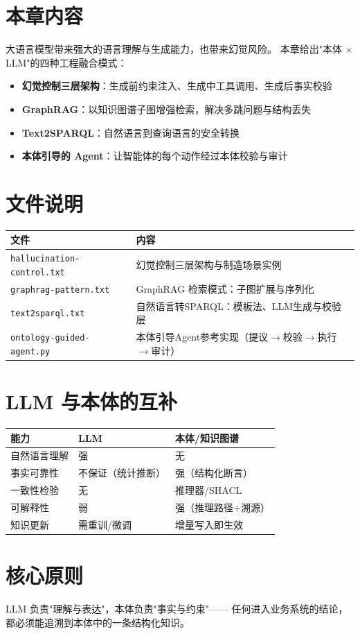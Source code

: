 
\section{本章内容}

大语言模型带来强大的语言理解与生成能力，也带来幻觉风险。
本章给出"本体 \(\times\) LLM"的四种工程融合模式：
\begin{itemize}
\item \textbf{幻觉控制三层架构}：生成前约束注入、生成中工具调用、生成后事实校验
\item \textbf{GraphRAG}：以知识图谱子图增强检索，解决多跳问题与结构丢失
\item \textbf{Text2SPARQL}：自然语言到查询语言的安全转换
\item \textbf{本体引导的 Agent}：让智能体的每个动作经过本体校验与审计
\end{itemize}

\section{文件说明}

\begin{center}
\begin{tabularx}{\linewidth}{@{}XX@{}}
\toprule
\textbf{文件} & \textbf{内容} \\
\midrule
\texttt{hallucination-control.txt} & 幻觉控制三层架构与制造场景实例 \\
\texttt{graphrag-pattern.txt} & GraphRAG 检索模式：子图扩展与序列化 \\
\texttt{text2sparql.txt} & 自然语言转SPARQL：模板法、LLM生成与校验层 \\
\texttt{ontology-guided-agent.py} & 本体引导Agent参考实现（提议\(\rightarrow\)校验\(\rightarrow\)执行\(\rightarrow\)审计） \\
\bottomrule
\end{tabularx}
\end{center}

\section{LLM 与本体的互补}

\begin{center}
\begin{tabular}{@{}lll@{}}
\toprule
\textbf{能力} & \textbf{LLM} & \textbf{本体/知识图谱} \\
\midrule
自然语言理解 & 强 & 无 \\
事实可靠性 & 不保证（统计推断） & 强（结构化断言） \\
一致性检验 & 无 & 推理器/SHACL \\
可解释性 & 弱 & 强（推理路径+溯源） \\
知识更新 & 需重训/微调 & 增量写入即生效 \\
\bottomrule
\end{tabular}
\end{center}

\section{核心原则}

\begin{noteblock}
LLM 负责"理解与表达"，本体负责"事实与约束"——
任何进入业务系统的结论，都必须能追溯到本体中的一条结构化知识。
\end{noteblock}
